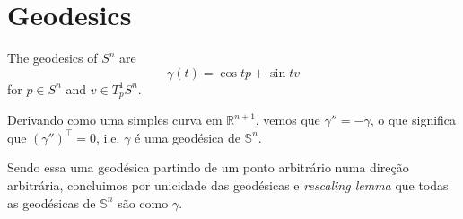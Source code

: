 \section{Geodesics}
\label{section-geodesics}

\begin{example}
\label{example-geodesics-of-Sn}
The geodesics of $S^n$ are 
\begin{equation}
\label{equation-geodesics-of-Sn}
\gamma(t)=\cos t p+\sin t v
\end{equation}
for $p \in S^n$ and $v\in T^1_pS^n$.

Derivando como uma simples curva em $\mathbb{R}^{n+1}$, vemos que
$\gamma''=-\gamma$, o que significa que $(\gamma'')^{\top}=0$, i.e. $\gamma$ é
uma geodésica de $\mathbb{S}^n$.

Sendo essa uma geodésica partindo de um ponto arbitrário numa direção
arbitrária, concluimos por unicidade das geodésicas e \textit{rescaling lemma}
que todas as geodésicas de $\mathbb{S}^n$ são como $\gamma$.
\end{example}

